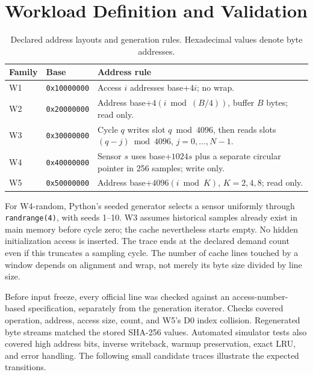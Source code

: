 \documentclass[11pt,a4paper]{article}
\begin{document}
\section{Workload Definition and Validation}\label{app:workloads}
\begin{table}[htbp]\centering\small
\caption{Declared address layouts and generation rules. Hexadecimal values denote byte addresses.}
\begin{tabularx}{\linewidth}{l l Y}\toprule
Family & Base & Address rule\\\midrule
W1 & \texttt{0x10000000} & Access $i$ addresses base+$4i$; no wrap.\\
W2 & \texttt{0x20000000} & Address base+$4(i\bmod(B/4))$, buffer $B$ bytes; read only.\\
W3 & \texttt{0x30000000} & Cycle $q$ writes slot $q\bmod4096$, then reads slots $(q-j)\bmod4096$, $j=0,\ldots,N-1$.\\
W4 & \texttt{0x40000000} & Sensor $s$ uses base+$1024s$ plus a separate circular pointer in 256 samples; write only.\\
W5 & \texttt{0x50000000} & Address base+$4096(i\bmod K)$, $K=2,4,8$; read only.\\\bottomrule
\end{tabularx}
\end{table}

For W4-random, Python's seeded generator selects a sensor uniformly through \texttt{randrange(4)}, with seeds 1--10. W3 assumes historical samples already exist in main memory before cycle zero; the cache nevertheless starts empty. No hidden initialization access is inserted. The trace ends at the declared demand count even if this truncates a sampling cycle. The number of cache lines touched by a window depends on alignment and wrap, not merely its byte size divided by line size.

Before input freeze, every official line was checked against an access-number-based specification, separately from the generation iterator. Checks covered operation, address, access size, count, and W5's D0 index collision. Regenerated byte streams matched the stored SHA-256 values. Automated simulator tests also covered high address bits, inverse writeback, warmup preservation, exact LRU, and error handling. The following small candidate traces illustrate the expected transitions.
\end{document}

